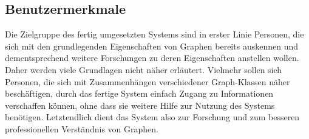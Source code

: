 \documentclass[11pt,a4paper]{article}
\begin{document}
\begin{enumerate}[leftmargin=.9cm]
\end{enumerate}
     
    \subsection{Benutzermerkmale} %
	Die Zielgruppe des fertig umgesetzten Systems sind in erster Linie Personen, die sich mit den grundlegenden Eigenschaften von Graphen bereits auskennen und dementsprechend weitere Forschungen zu deren Eigenschaften anstellen wollen. Daher werden viele Grundlagen nicht näher erläutert. Vielmehr sollen sich Personen, die sich mit Zusammenhängen verschiedener Graph-Klassen näher beschäftigen, durch das fertige System einfach Zugang zu Informationen verschaffen können, ohne dass sie weitere Hilfe zur Nutzung des Systems benötigen.
	Letztendlich dient das System also zur Forschung und zum besseren professionellen Verständnis von Graphen.
\end{document}
